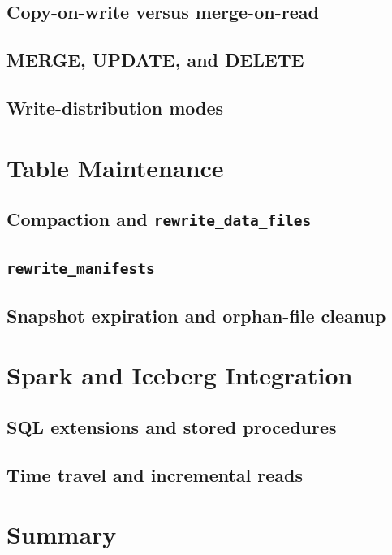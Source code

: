 \subsection{Copy-on-write versus merge-on-read}
\tbd

\subsection{MERGE, UPDATE, and DELETE}
\tbd

\subsection{Write-distribution modes}
\tbd

\section{Table Maintenance}
\label{sec:ice-maintenance}

\subsection{Compaction and \texttt{rewrite\_data\_files}}
\tbd

\subsection{\texttt{rewrite\_manifests}}
\tbd

\subsection{Snapshot expiration and orphan-file cleanup}
\tbd

\section{Spark and Iceberg Integration}
\label{sec:ice-spark}

\subsection{SQL extensions and stored procedures}
\tbd

\subsection{Time travel and incremental reads}
\tbd

\section{Summary}
\tbd
